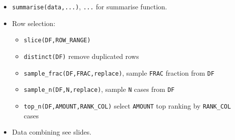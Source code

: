 \begin{itemize}[topsep=2pt,itemsep=0pt]
    \item \lstinline|summarise(data,...)|, \lstinline|...| for summarise function.

    \item Row selection:
    \begin{itemize}[topsep=2pt,itemsep=0pt]
        \item \lstinline|slice(DF,ROW_RANGE)|
        \item \lstinline|distinct(DF)| remove duplicated rows
        \item \lstinline|sample_frac(DF,FRAC,replace)|, sample \lstinline|FRAC| fraction from \lstinline|DF|
        \item \lstinline|sample_n(DF,N,replace)|, sample \lstinline|N| cases from \lstinline|DF|
        \item \lstinline|top_n(DF,AMOUNT,RANK_COL)| select \lstinline|AMOUNT| top ranking by \lstinline|RANK_COL| cases
    \end{itemize}
    \item Data combining see slides.
\end{itemize}

